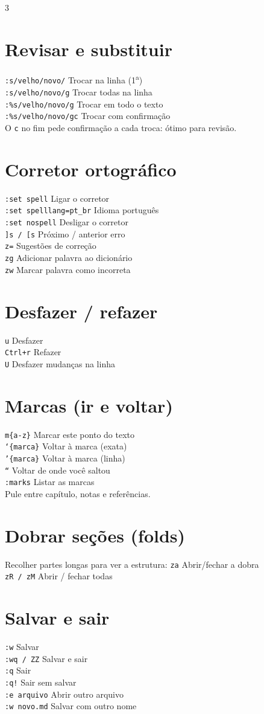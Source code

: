 \documentclass[10pt,a4paper]{article}
\newcommand{\key}[1]{{\small\texttt{#1}}}
\newcommand{\desc}[1]{{\small #1}}
\newcommand{\K}[2]{\key{#1} \hfill \desc{#2}\\[1.5pt]}
\begin{document}
\begin{multicols}{3}
\section{Revisar e substituir}
\K{:s/velho/novo/}{Trocar na linha (1\textsuperscript{a})}
\K{:s/velho/novo/g}{Trocar todas na linha}
\K{:\%s/velho/novo/g}{Trocar em todo o texto}
\K{:\%s/velho/novo/gc}{Trocar com confirma\c{c}\~ao}
\desc{O \texttt{c} no fim pede confirma\c{c}\~ao a cada troca: \'otimo para revis\~ao.}

\section{Corretor ortogr\'afico}
\K{:set spell}{Ligar o corretor}
\K{:set spelllang=pt\_br}{Idioma portugu\^es}
\K{:set nospell}{Desligar o corretor}
\K{]s / [s}{Pr\'oximo / anterior erro}
\K{z=}{Sugest\~oes de corre\c{c}\~ao}
\K{zg}{Adicionar palavra ao dicion\'ario}
\K{zw}{Marcar palavra como incorreta}

\section{Desfazer / refazer}
\K{u}{Desfazer}
\K{Ctrl+r}{Refazer}
\K{U}{Desfazer mudan\c{c}as na linha}

\section{Marcas (ir e voltar)}
\K{m\{a-z\}}{Marcar este ponto do texto}
\K{`\{marca\}}{Voltar \`a marca (exata)}
\K{'\{marca\}}{Voltar \`a marca (linha)}
\K{``}{Voltar de onde voc\^e saltou}
\K{:marks}{Listar as marcas}
\desc{Pule entre cap\'itulo, notas e refer\^encias.}

\section{Dobrar se\c{c}\~oes (folds)}
\desc{Recolher partes longas para ver a estrutura:}
\vspace{3pt}
\K{za}{Abrir/fechar a dobra}
\K{zR / zM}{Abrir / fechar todas}

\section{Salvar e sair}
\K{:w}{Salvar}
\K{:wq / ZZ}{Salvar e sair}
\K{:q}{Sair}
\K{:q!}{Sair sem salvar}
\K{:e arquivo}{Abrir outro arquivo}
\K{:w novo.md}{Salvar com outro nome}


\end{multicols}
\end{document}
